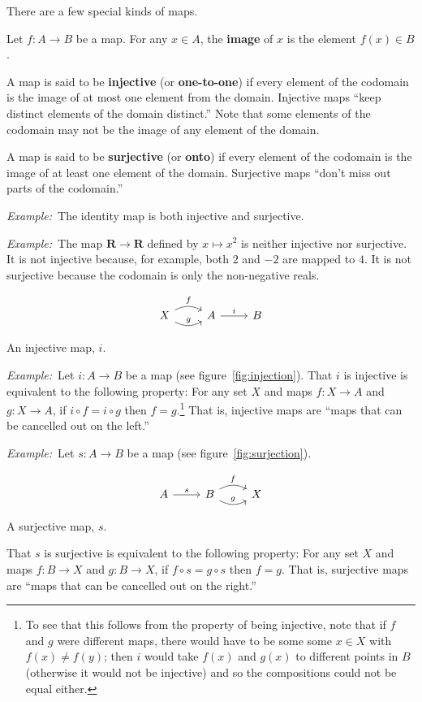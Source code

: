 \documentclass[12pt, a4paper]{article}
\newcommand{\defn}[1]{\textbf{#1}}
\newcommand{\set}[1]{\mathbold{#1}}
\newcommand{\eg}{\emph{Example:}\relax}
\begin{document}
There are a few special kinds of maps. 
 
Let $f:A\to B$ be a map. For any $x\in A$, the \defn{image} of $x$ is the
element $f(x)\in B$.

A map is said to be \defn{injective} (or \defn{one-to-one}) if every
element of the codomain is the image of at most one element from the
domain. Injective maps “keep distinct elements of the domain
distinct.” Note that some elements of the codomain may not be the
image of any element of the domain.

A map is said to be \defn{surjective} (or \defn{onto}) if every
element of the codomain is the image of at least one element of the
domain. Surjective maps “don't miss out parts of the codomain.”

\eg\ The identity map is both injective and surjective.

\eg\ The map $\set{R}\to\set{R}$ defined by $x\mapsto x^2$ is neither
injective nor surjective. It is not injective because, for example,
both $2$ and $-2$ are mapped to $4$. It is not surjective because the
codomain is only the non-negative reals.

\begin{sidefigure}
\[\begin{tikzcd}
  X \arrow[r, bend left, "f"] \arrow [r, bend right, "g"] & A \arrow[r, "i"] & B
\end{tikzcd}\]
  \caption{An injective map, $i$.\label{fig:injection}}
\end{sidefigure}
\eg\ Let $i\colon A\to B$ be a map (see
figure~\ref{fig:injection}). That $i$ is injective is equivalent to
the following property: For any set $X$ and maps $f\colon X\to A$ and
$g\colon X\to A$, if $i\circ f = i\circ g$ then $f = g$.\footnote{To see that
this follows from the property of being injective, note that if $f$
and $g$ were different maps, there would have to be some some $x \in X$
with $f(x)\neq f(y)$; then $i$ would take $f(x)$ and $g(x)$ to different
points in $B$ (otherwise it would not be injective) and so the
compositions could not be equal either.} That is, injective maps are
“maps that can be cancelled out on the left.”

\eg\ Let $s\colon A\to B$ be a map (see
figure~\ref{fig:surjection}).
\begin{sidefigure}
\[\begin{tikzcd}
  A \arrow[r, "s"] & B \arrow[r, bend left, "f"] \arrow [r, bend right, "g"] & X 
\end{tikzcd}\]
  \caption{A surjective map, $s$.\label{fig:surjection}}
\end{sidefigure}
That $s$ is surjective is equivalent to
the following property: For any set $X$ and maps $f\colon B\to X$ and
$g\colon B\to X$, if $f\circ s = g\circ s$ then $f = g$. That is, surjective
maps are “maps that can be cancelled out on the right.”
\end{document}
